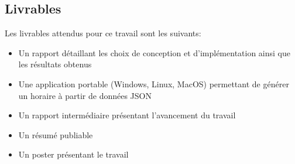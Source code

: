 \subsection{Livrables}
Les livrables attendus pour ce travail sont les suivants:

\begin{itemize}
    \item Un rapport détaillant les choix de conception et d'implémentation ainsi que les résultats obtenus
    \item Une application portable (Windows, Linux, MacOS) permettant de générer un horaire à partir de données JSON
    \item Un rapport intermédiaire présentant l'avancement du travail
    \item Un résumé publiable
    \item Un poster présentant le travail
\end{itemize}